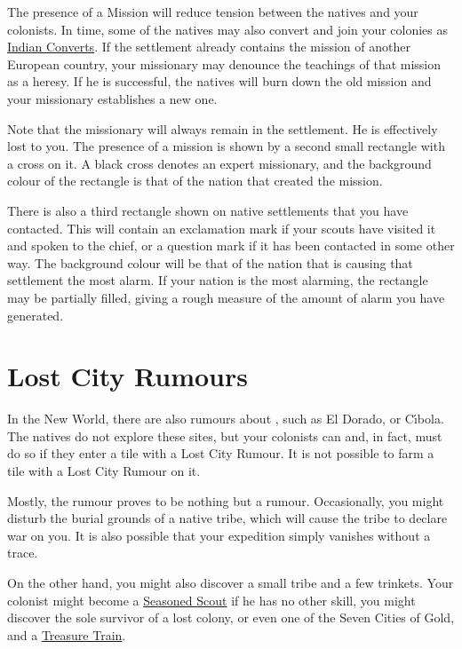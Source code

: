 \documentclass[12pt]{book}
\begin{document}
The presence of a Mission will reduce tension between the natives and
your colonists. In time, some of the natives may also convert and join
your colonies as \hyperlink{Indian Convert}{Indian Converts}. If the
settlement already contains the mission of another European country,
your missionary may denounce the teachings of that mission as a
heresy. If he is successful, the natives will burn down the old
mission and your missionary establishes a new one.

Note that the missionary will always remain in the settlement. He is
effectively lost to you.  The presence of a mission is shown by a
second small rectangle with a cross on it.  A black cross denotes an expert
missionary, and the background colour of the rectangle is that of the
nation that created the mission.

There is also a third rectangle shown on native settlements that you
have contacted.  This will contain an exclamation mark if your scouts
have visited it and spoken to the chief, or a question mark if it has
been contacted in some other way.  The background colour will be that
of the nation that is causing that settlement the most alarm.  If your
nation is the most alarming, the rectangle may be partially filled,
giving a rough measure of the amount of alarm you have generated.


\hypertarget{Lost City Rumours}{\section{Lost City Rumours}}

In the New World, there are also rumours about ,
such as El Dorado, or C{\'\i}bola. The natives do not explore these
sites, but your colonists can and, in fact, must do so if they enter a
tile with a Lost City Rumour. It is not possible to farm a tile with a
Lost City Rumour on it.

Mostly, the rumour proves to be nothing but a rumour. Occasionally,
you might disturb the burial grounds of a native tribe, which will
cause the tribe to declare war on you. It is also possible that your
expedition simply vanishes without a trace.

On the other hand, you might also discover a small tribe and a few
trinkets. Your colonist might become a \hyperlink{Seasoned
  Scout}{Seasoned Scout} if he has no other skill, you might discover
the sole survivor of a lost colony, or even one of the Seven Cities of
Gold, and a \hyperlink{Treasure Train}{Treasure Train}.
\end{document}
